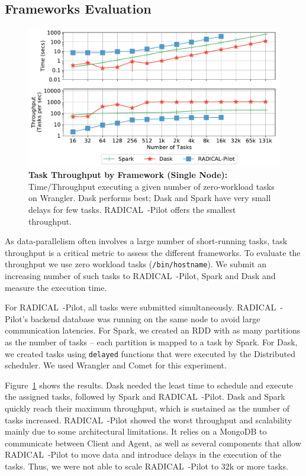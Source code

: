 \subsection{Frameworks Evaluation}
\label{sec:framework_eval}

\begin{figure}[t]
    \centering
    \includegraphics[width=.95\textwidth]{figures/data_analytics_hpc/task_par/dask_spark_rp_wrangler.pdf}
    \caption{\textbf{Task Throughput by Framework (Single Node):} 
        Time/Throughput executing a given number of zero-workload tasks on Wrangler.
        Dask performs best; Dask and Spark have very small delays for few tasks.
        RADICAL~-Pilot offers the smallest throughput.}
    \label{fig:dask_spark_rp_wrangler}
\end{figure}

As data-parallelism often involves a large number of short-running tasks, task throughput is a critical metric to assess the different frameworks.
To evaluate the throughput we use zero workload tasks (\texttt{/bin/hostname}).
We submit an increasing number of such tasks to RADICAL~-Pilot, Spark and Dask and measure the execution time.

For RADICAL~-Pilot, all tasks were submitted simultaneously. RADICAL~-Pilot's backend database was running on the same node to avoid large communication latencies.
For Spark, we created an RDD with as many partitions as the number of tasks -- each partition is mapped to a task by Spark.
For Dask, we created tasks using \texttt{delayed} functions that were executed by the Distributed scheduler.
We used Wrangler and Comet for this experiment.

Figure~\ref{fig:dask_spark_rp_wrangler} shows the results.
Dask needed the least time to schedule and execute the assigned tasks, followed by Spark and RADICAL~-Pilot.
Dask and Spark quickly reach their maximum throughput, which is sustained as the number of tasks increased.
RADICAL~-Pilot showed the worst throughput and scalability mainly due to some architectural limitations.
It relies on a MongoDB to communicate between Client and Agent, as well as several components that allow RADICAL~-Pilot to move data and introduce delays in the execution of the tasks.
Thus, we were not able to scale RADICAL~-Pilot to 32k or more tasks.

